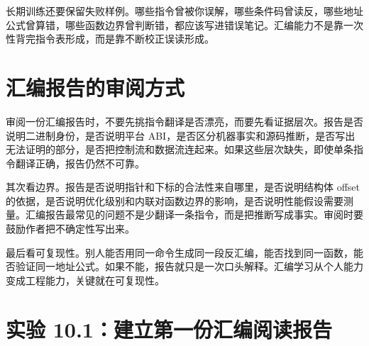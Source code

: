 长期训练还要保留失败样例。哪些指令曾被你误解，哪些条件码曾读反，哪些地址公式曾算错，哪些函数边界曾判断错，都应该写进错误笔记。汇编能力不是靠一次性背完指令表形成，而是靠不断校正误读形成。

\section{汇编报告的审阅方式}

审阅一份汇编报告时，不要先挑指令翻译是否漂亮，而要先看证据层次。报告是否说明二进制身份，是否说明平台 ABI，是否区分机器事实和源码推断，是否写出无法证明的部分，是否把控制流和数据流连起来。如果这些层次缺失，即使单条指令翻译正确，报告仍然不可靠。

其次看边界。报告是否说明指针和下标的合法性来自哪里，是否说明结构体 offset 的依据，是否说明优化级别和内联对函数边界的影响，是否说明性能假设需要测量。汇编报告最常见的问题不是少翻译一条指令，而是把推断写成事实。审阅时要鼓励作者把不确定性写出来。

最后看可复现性。别人能否用同一命令生成同一段反汇编，能否找到同一函数，能否验证同一地址公式。如果不能，报告就只是一次口头解释。汇编学习从个人能力变成工程能力，关键就在可复现性。

\section{实验 10.1：建立第一份汇编阅读报告}

